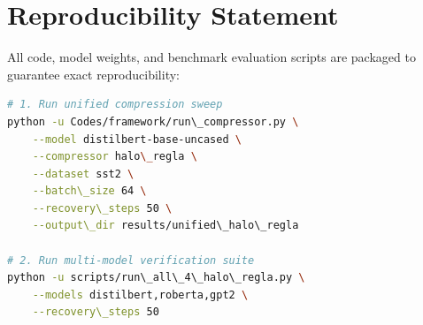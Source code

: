 \section{Reproducibility Statement}
All code, model weights, and benchmark evaluation scripts are packaged to guarantee exact reproducibility:
\begin{lstlisting}[language=bash]
# 1. Run unified compression sweep
python -u Codes/framework/run\_compressor.py \
    --model distilbert-base-uncased \
    --compressor halo\_regla \
    --dataset sst2 \
    --batch\_size 64 \
    --recovery\_steps 50 \
    --output\_dir results/unified\_halo\_regla

# 2. Run multi-model verification suite
python -u scripts/run\_all\_4\_halo\_regla.py \
    --models distilbert,roberta,gpt2 \
    --recovery\_steps 50
\end{lstlisting}

